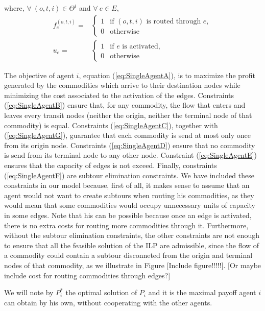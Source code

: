 \documentclass[review]{elsarticle}
\begin{document}
where, $\forall\ (o,t,i)\in \Theta^i$ and  $\forall\ e \in E$,
\[
\begin{array}{rl}
f_e^{(o,t,i)} = & \begin{cases}
    1 & \text{if } (o,t,i) \text{ is routed through } e,\\
    0 & \text{otherwise}
\end{cases}  \\[20pt]
u_e = &\begin{cases}
    1 & \text{if } e \text{ is activated},\\
    0 & \text{otherwise}    
\end{cases}
\end{array}
\]

The objective of agent $i$, equation (\ref{eq:SingleAgentA}), is to maximize the
profit generated by the commodities which arrive to their destination nodes
while minimizing the cost associated to the activation of the edges. Constraints
(\ref{eq:SingleAgentB}) ensure that, for any commodity, the flow that enters
and leaves every transit nodes (neither the origin, neither the terminal node of
that commodity) is equal. Constraints (\ref{eq:SingleAgentC}), together with
(\ref{eq:SingleAgentG}), guarantee that each commodity is send at most only once
from its origin node. Constraints (\ref{eq:SingleAgentD}) ensure that no
commodity is send from its terminal node to any other node. Constraint (\ref{eq:SingleAgentE})
ensures that the capacity of edges is not exceed. Finally, constraints
(\ref{eq:SingleAgentF}) are subtour elimination constraints. We have included these constraints in our model because, first of all, it makes sense to assume that an agent would not want to create subtours when routing his commodities, as they would mean that some commodities would occupy unnecessary units of capacity in some edges. Note that his can be possible because once an edge is activated, there is no extra costs for routing more commodities through it. Furthermore, without the subtour elimination constraints, the other constraints are not enough to ensure that all the feasible solution of the ILP are admissible, since the flow of a commodity could contain a subtour disconneted from the origin and terminal nodes of that commodity, as we illustrate in Figure [Include figure!!!!!]. [Or maybe include cost for routing commodities through edges?]

We will note by $P_i^*$ the optimal solution of $P_i$ and it is the maximal
payoff agent $i$ can obtain by his own, without cooperating with the other agents.
\end{document}

